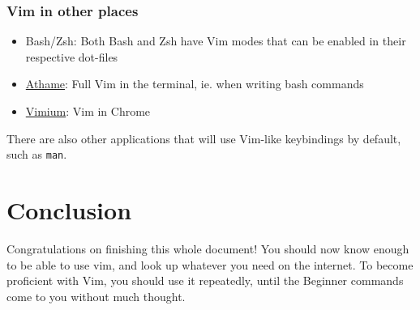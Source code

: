 \documentclass[11pt]{article}
\begin{document}
\subsubsection{Vim in other places}
\label{sec:org87beeb4}
\begin{itemize}
\item Bash/Zsh: Both Bash and Zsh have Vim modes that can be enabled in their respective dot-files
\item \href{https://github.com/ardagnir/athame}{Athame}: Full Vim in the terminal, ie. when writing bash commands
\item \href{https://chrome.google.com/webstore/detail/vimium/dbepggeogbaibhgnhhndojpepiihcmeb}{Vimium}: Vim in Chrome
\end{itemize}

There are also other applications that will use Vim-like keybindings by default,
such as \texttt{man}.
\section{Conclusion}
\label{sec:orgcc490c7}
Congratulations on finishing this whole document! You should now know enough to
be able to use vim, and look up whatever you need on the internet. To become
proficient with Vim, you should use it repeatedly, until the Beginner commands
come to you without much thought.
\end{document}
